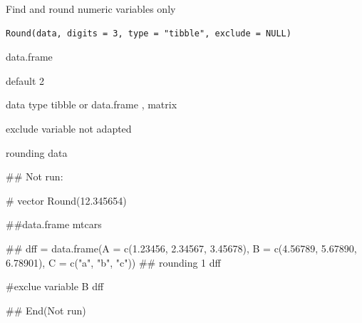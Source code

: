 \documentclass[a4paper]{book}
\begin{document}
%
\begin{Description}
Find and round numeric variables only
\end{Description}
%
\begin{Usage}
\begin{verbatim}
Round(data, digits = 3, type = "tibble", exclude = NULL)
\end{verbatim}
\end{Usage}
%
\begin{Arguments}
\begin{ldescription}
\item[\code{data}] data.frame

\item[\code{digits}] default 2

\item[\code{type}] data type tibble or data.frame , matrix

\item[\code{exclude}] exclude variable not adapted
\end{ldescription}
\end{Arguments}
%
\begin{Value}
rounding data
\end{Value}
%
\begin{Examples}
\begin{ExampleCode}
\#\# Not run: 

# vector
Round(12.345654)

##data.frame
mtcars%

 ##
dff = data.frame(A = c(1.23456, 2.34567, 3.45678),
                 B = c(4.56789, 5.67890, 6.78901),
                C = c("a", "b", "c"))
 ## rounding 1
 dff%

#exclue variable B
 dff%


## End(Not run)
\end{ExampleCode}
\end{Examples}
\end{document}
